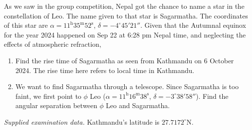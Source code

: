 As we saw in the group competition, Nepal got the chance to name a star in the constellation of Leo. The name given to that star is Sagarmatha. The coordinates of this star are $\alpha=11^{\mathrm h}35^{\mathrm m}52^{\mathrm s}$, $\delta=-4^\circ45'21''$. Given that the Autumnal equinox for the year 2024 happened on Sep 22 at 6:28 pm Nepal time, and neglecting the effects of atmospheric refraction,
\begin{enumerate}
\item Find the rise time of Sagarmatha as seen from Kathmandu on 6 October 2024. The rise time here refers to local time in Kathmandu.
\item We want to find Sagarmatha through a telescope. Since Sagarmatha is too faint, we first point to $\phi$ Leo ($\alpha=11^{\mathrm h}16^{\mathrm m}38^{\mathrm s}$, $\delta=-3^\circ38'58''$). Find the angular separation between $\phi$ Leo and Sagarmatha.
\end{enumerate}
\textit{Supplied examination data.} Kathmandu's latitude is $27.7172^\circ\mathrm{N}$.
